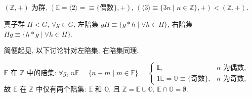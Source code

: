 \documentclass{note}
\begin{document}
\begin{eg}
    $(\mathbb{Z},+)$ 为群, $(\mathbb{E}=\langle 2\rangle=\equiv\{偶数\},+)$, $(\langle 3\rangle\equiv\{3n\mid n\in\mathbb{Z}\},+)<(\mathbb{Z},+)$.
\end{eg}

\begin{df}[陪集 (Coset)]
    真子群 $H<G$, $\forall g\in G$, 左陪集 $gH\equiv\{g*h\mid\forall h\in H\}$, 右陪集 $Hg\equiv\{h*g\mid\forall h\in H\}$.
\end{df}

简便起见, 以下讨论针对左陪集, 右陪集同理.

\begin{eg}
    $\mathbb{E}$ 在 $\mathbb{Z}$ 中的陪集: $\forall g$, $n\mathbb{E}=\{n+m\mid m\in\mathbb{E}\}=\left\{\begin{array}{ll}
        \mathbb{E},&n\text{ 为偶数},\\
        1\mathbb{E}=\mathbb{O}\equiv\{\text{奇数}\},&n\text{ 为奇数},
    \end{array}\right.$ 故 $\mathbb{E}$ 在 $\mathbb{Z}$ 中仅有两个陪集: $\mathbb{E}$ 和 $\mathbb{O}$, 且 $\mathbb{Z}=\mathbb{E}\cup\mathbb{O}$, $\mathbb{E}\cap\mathbb{O}=\emptyset$.
\end{eg}
\end{document}
